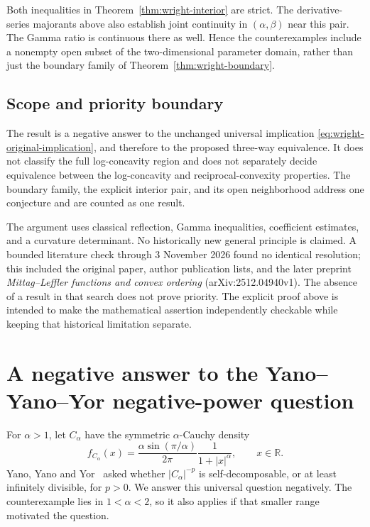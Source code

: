 \documentclass[11pt,a4paper]{article}
\theoremstyle{definition}
\theoremstyle{remark}
\numberwithin{equation}{section}
\begin{document}
Both inequalities in Theorem~\ref{thm:wright-interior} are strict.
The derivative-series majorants above also establish joint continuity
in $(\alpha,\beta)$ near this pair. The Gamma ratio is continuous
there as well. Hence the counterexamples include a nonempty open
subset of the two-dimensional parameter domain, rather than just the
boundary family of Theorem~\ref{thm:wright-boundary}.

\subsection{Scope and priority boundary}

The result is a negative answer to the unchanged universal implication
\eqref{eq:wright-original-implication}, and therefore to the proposed
three-way equivalence. It does not classify the full log-concavity
region and does not separately decide equivalence between the
log-concavity and reciprocal-convexity properties. The boundary
family, the explicit interior pair, and its open neighborhood address
one conjecture and are counted as one result.

The argument uses classical reflection, Gamma inequalities,
coefficient estimates, and a curvature determinant. No historically
new general principle is claimed. A bounded literature check through
3 November 2026 found no identical resolution; this included the
original paper, author publication lists, and the later preprint
\emph{Mittag--Leffler functions and convex ordering}
(arXiv:2512.04940v1). The absence of a result in that search does not
prove priority. The explicit proof above is intended to make the
mathematical assertion independently checkable while keeping that
historical limitation separate.


\section{A negative answer to the Yano--Yano--Yor negative-power question}
\label{sec:yyy}

For $\alpha>1$, let $C_\alpha$ have the symmetric $\alpha$-Cauchy density
\begin{equation}
 f_{C_\alpha}(x)=\frac{\alpha\sin(\pi/\alpha)}{2\pi}
                  \frac{1}{1+|x|^\alpha},\qquad x\in\mathbb R.
 \label{eq:yyy-density}
\end{equation}
Yano, Yano and Yor~\cite[Remark~2.9(iii)]{YanoYanoYor2009}
asked whether $|C_\alpha|^{-p}$ is self-decomposable, or at least
infinitely divisible, for $p>0$. We answer this universal question
negatively. The counterexample lies in $1<\alpha<2$, so it also applies
if that smaller range motivated the question.
\end{document}

